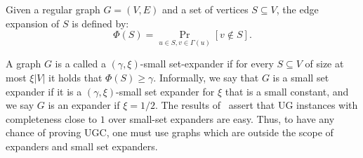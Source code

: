 \begin{definition}
Given a regular graph $G=(V,E)$ and a set 
of vertices $S\subseteq V$, the edge expansion of $S$ is defined by:
\[
\Phi(S) = \Pr_{u\in S, v\in \Gamma(u)}\left[v\not\in S\right].
\]
\end{definition}
A graph $G$ is a called a $(\gamma,\xi)$-small set-expander if for every $S\subseteq V$ of size at most $\xi |V|$  it holds that $\Phi(S)\geq \gamma$. Informally, we say that $G$ is a small set expander if it is a $(\gamma,\xi)$-small set 
expander for $\xi$ that is a small constant, and we say $G$ is an expander 
if $\xi = 1/2$. The results of~\cite{AroraKKSTV08,MMlocalexpander,DBLP:journals/eccc/AroraIMS10,BBKSS}
 assert that UG instances with completeness close to $1$ over small-set expanders are easy. 
Thus, to have any chance of proving UGC, one must use graphs 
which are outside the scope of expanders and small set expanders.


